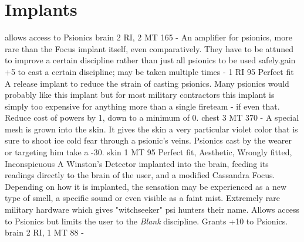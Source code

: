 \documentclass[12pt,a4paper,openany,usenames,dvipsnames]{book}
\begin{document}
	\section{Implants}
        {allows access to Psionics}
        {brain}
        {2 RI, 2 MT}
        {165}
        {-}
        {An amplifier for psionics, more rare than the Focus implant itself, even comparatively. They have to be attuned to improve a certain discipline rather than just all psionics to be used safely.}{gain +5 to cast a certain discipline; may be taken multiple times}
        {-}
        {1 RI}
        {95}
        {Perfect fit}
        {A release implant to reduce the strain of casting psionics. Many psionics would probably like this implant but for most military contractors this implant is simply too expensive for anything more than a single fireteam - if even that.}
        {Reduce cost of powers by 1, down to a minimum of 0.}
        {chest}
        {3 MT}
        {370}
        {-}
        {A special mesh is grown into the skin. It gives the skin a very particular violet color that is sure to shoot ice cold fear through a psionic's veins.}
        {Psionics cast by the wearer or targeting him take a -30.}
        {skin}
        {1 MT}
        {95}
        {Perfect fit, Aesthetic, Wrongly fitted, Inconspicuous}
        {A Winston's Detector implanted into the brain, feeding its readings directly to the brain of the user, and a modified Cassandra Focus. Depending on how it is implanted, the sensation may be experienced as a new type of smell, a specific sound or even visible as a faint mist. Extremely rare military hardware which gives "witchseeker" psi hunters their name.}
        {Allows access to Psionics but limits the user to the \emph{Blank} discipline. Grants +10 to Psionics.}
        {brain}
        {2 RI, 1 MT}
        {88}
        {-}
\end{document}
